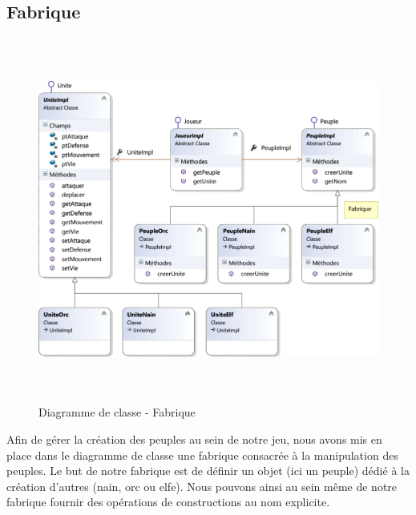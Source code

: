 \documentclass[a4paper,11pt]{article}
\begin{document}
	\subsection{Fabrique}
		\begin{figure}[ht!]
			\includegraphics[height=12cm,width=14cm]{Diagrammes/Classe/fabrique.png}
			\caption{Diagramme de classe - Fabrique}
			\label{fig:fabrique}
		\end{figure}
		\vspace*{1cm}
		Afin de gérer la création des peuples au sein de notre jeu, nous avons mis en place dans le diagramme de classe une fabrique consacrée à la manipulation des peuples. Le but de notre fabrique est de définir un objet (ici un peuple) dédié à la création d’autres (nain, orc ou elfe). Nous pouvons ainsi au sein même de notre fabrique fournir des opérations de constructions au nom explicite.
		\newpage
\end{document}
